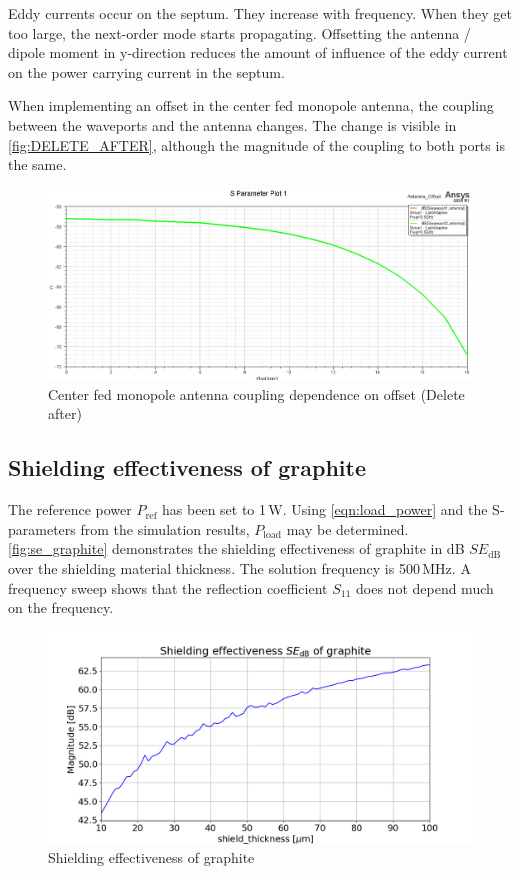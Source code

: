 Eddy currents occur on the septum. They increase with frequency. When they get too large, the next-order mode starts propagating. Offsetting the antenna / dipole moment in y-direction reduces the amount of influence of the eddy current on the power carrying current in the septum. 



When implementing an offset in the center fed monopole antenna, the coupling between the waveports and the antenna changes. The change is visible in \autoref{fig:DELETE_AFTER}, although the magnitude of the coupling to both ports is the same.

\begin{figure}[h]
    \centering
    \includegraphics[width=1\linewidth]{DELETE_AFTER.png}
    \caption{Center fed monopole antenna coupling dependence on offset (Delete after)}
    \label{fig:DELETE_AFTER}
\end{figure}

\subsection{Shielding effectiveness of graphite}

The reference power $P_\mathrm{ref}$ has been set to 1\,W. Using \autoref{eqn:load_power} and the S-parameters from the simulation results, $P_\mathrm{load}$ may be determined. \autoref{fig:se_graphite} demonstrates the shielding effectiveness of graphite in dB $SE_\mathrm{dB}$ over the shielding material thickness. The solution frequency is 500\,MHz. A frequency sweep shows that the reflection coefficient $S_{11}$ does not depend much on the frequency. 

\begin{figure}[h]
    \centering
    \includegraphics[width=1\linewidth]{content//30_simulations//img/se_graphite.png}
    \caption{Shielding effectiveness of graphite}
    \label{fig:se_graphite}
\end{figure}

